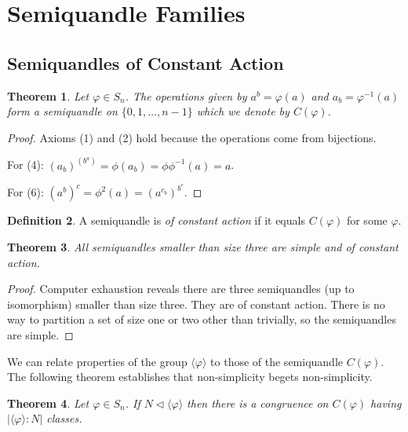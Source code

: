 \documentclass{amsart}
\newtheorem{thm}{Theorem}[section]
\theoremstyle{definition}
\newtheorem{definition}[thm]{Definition}
\numberwithin{equation}{section}
\begin{document}
\section{Semiquandle Families}

\subsection{Semiquandles of Constant Action}

\begin{thm}
Let $\varphi \in S_n$. The operations given by $a^{b} = \varphi(a)$
and $a_b = \varphi^{-1}(a)$ form a semiquandle on $\{0, 1, \ldots,
n-1\}$ which we denote by $C(\varphi)$.
\end{thm}

\begin{proof}
  Axioms (1) and (2) hold because the operations come from bijections.

For (4): $(a_b)^{(b^a)} = \phi(a_b) = \phi \phi^{-1}(a) = a$.

For (6): $(a^b)^c = \phi^{2}(a) = (a^{c_b})^{b^c}$.
\end{proof}

\begin{definition}
A semiquandle is \emph{of constant action} if it equals $C(\varphi)$
for some $\varphi$.
\end{definition}

\begin{thm}
All semiquandles smaller than size three are simple and of constant
action.
\end{thm}

\begin{proof}
Computer exhaustion reveals there are three semiquandles (up to
isomorphism) smaller than size three. They are of constant action.
There is no way to partition a set of size one or two other than
trivially, so the semiquandles are simple.
\end{proof}

We can relate properties of the group $\langle\varphi\rangle$ to
those of the semiquandle $C(\varphi)$.  The following theorem
establishes that non-simplicity begets non-simplicity.

\begin{thm}
Let $\varphi \in S_n$. If $N \lhd \langle\varphi\rangle$ then there
is a congruence on $C(\varphi)$ having $\left|\langle\varphi\rangle
: N\right|$ classes.
\end{thm}
\end{document}
